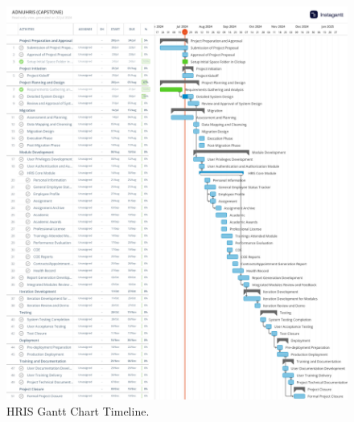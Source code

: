 \begin{figure}[H]
    \centering
    \includegraphics[width=1\linewidth]{figures/images/gantt-chart.png}
    \caption{HRIS Gantt Chart Timeline.}
    \label{fig:gantt-chart}
\end{figure}





